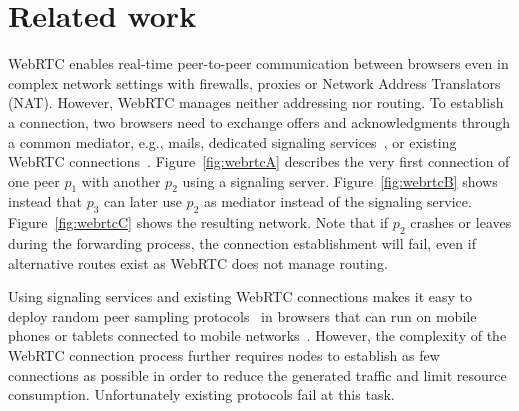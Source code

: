 
\section{Related work}
\label{sec:relatedwork}

WebRTC enables real-time peer-to-peer communication between browsers
even in complex network settings with firewalls, proxies or Network
Address Translators (NAT). However, WebRTC manages neither addressing
nor routing. To establish a connection, two browsers need to exchange
offers and acknowledgments through a common mediator, e.g., mails,
dedicated signaling services~\cite{peerjs}, or existing WebRTC
connections~\cite{p}. Figure~\ref{fig:webrtcA} describes the very
first connection of one peer $p_1$ with another $p_2$ using a
signaling server. Figure~\ref{fig:webrtcB} shows instead that $p_3$
can later use $p_2$ as mediator instead of the signaling
service. Figure~\ref{fig:webrtcC} shows the resulting network. Note
that if $p_2$ crashes or leaves during the forwarding
process, the connection establishment will fail, even if
alternative routes exist as WebRTC does not manage routing.


Using signaling services and existing WebRTC connections makes it easy
to deploy random peer sampling protocols~\cite{jelasity2004peer} in
browsers that can run on mobile phones or tablets connected to mobile
networks~\cite{Carvajal-Gómez2015}. However, the complexity of the
WebRTC connection process further requires nodes to establish as few
connections as possible in order to reduce the generated traffic and
limit resource consumption. Unfortunately existing protocols fail at
this task.


